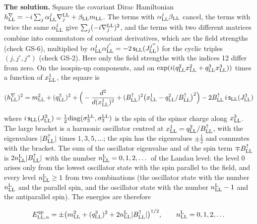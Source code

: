 \documentclass[
  10pt,
]{article}
\begin{document}
\textbf{The solution.} Square the covariant Dirac Hamiltonian
\(h^\nabla_{\rm LL}=-i\sum_j\alpha^j_{\rm LL}\nabla^{\rm LL}_j+\beta_{\rm LL}m_{\rm LL}\).
The terms with \(\alpha^j_{\rm LL}\beta_{\rm LL}\) cancel, the terms
with twice the same \(\alpha^j_{\rm LL}\) give
\(\sum_j(-i\nabla^{\rm LL}_j)^2\), and the terms with two different
matrices combine into commutators of covariant derivatives, which are
the field strengths (check GS-6), multiplied by
\(\alpha^j_{\rm LL}\alpha^{j'}_{\rm LL}=-2\,\mathsf s_{\rm LL}(J^{j''}_{\rm LL})\)
for the cyclic triples \((j,j',j'')\) (check GS-2). Here only the field
strengths with the indices 12 differ from zero. On the isospin-up
components, and on
\(\exp(i(q^2_{\rm LL}x^2_{\rm LL}+q^3_{\rm LL}x^3_{\rm LL}))\) times a
function of \(x^1_{\rm LL}\), the square is

\[(h^\nabla_{\rm LL})^2=m_{\rm LL}^2+(q^3_{\rm LL})^2+\Big(-\frac{d^2}{d(x^1_{\rm LL})^2}+(B^\uparrow_{\rm LL})^2\big(x^1_{\rm LL}-q^2_{\rm LL}/B^\uparrow_{\rm LL}\big)^2\Big)-2B^\uparrow_{\rm LL}\,i\,\mathsf s_{\rm LL}(J^3_{\rm LL})\]

where
\(i\,\mathsf s_{\rm LL}(J^3_{\rm LL})=\tfrac12\mathrm{diag}(\sigma^{\rm LL}_3,\sigma^{\rm LL}_3)\)
is the spin of the spinor charge along \(x^3_{\rm LL}\). The large
bracket is a harmonic oscillator centred at
\(x^1_{\rm LL}=q^2_{\rm LL}/B^\uparrow_{\rm LL}\), with the eigenvalues
\(\lvert B^\uparrow_{\rm LL}\rvert\) times \(1,3,5,\dots\); the spin has
the eigenvalues \(\pm\tfrac12\) and commutes with the bracket. The sum
of the oscillator eigenvalue and of the spin term
\(\mp B^\uparrow_{\rm LL}\) is
\(2n^{\rm L}_{\rm LL}\lvert B^\uparrow_{\rm LL}\rvert\) with the number
\(n^{\rm L}_{\rm LL}=0,1,2,\dots\) of the Landau level: the level 0
arises only from the lowest oscillator state with the spin parallel to
the field, and every level \(n^{\rm L}_{\rm LL}\ge1\) from two
combinations (the oscillator state with the number
\(n^{\rm L}_{\rm LL}\) and the parallel spin, and the oscillator state
with the number \(n^{\rm L}_{\rm LL}-1\) and the antiparallel spin). The
energies are therefore

\[E^{\rm qp}_{{\rm LL},n}=\pm\big(m_{\rm LL}^2+(q^3_{\rm LL})^2+2n^{\rm L}_{\rm LL}\lvert B^\uparrow_{\rm LL}\rvert\big)^{1/2},\qquad n^{\rm L}_{\rm LL}=0,1,2,\dots\]
\end{document}
